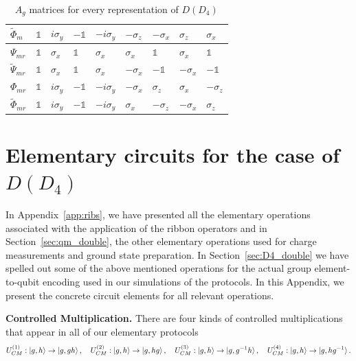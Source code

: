 \documentclass[two column]{article}
\begin{document}
\begin{table}[]
\begin{tabular}{|l||l|l|l|l|l|l|l|l|}
 $\tilde{\Phi}_{m}$ &$\mathbb{1}$&$i\sigma_y$ &$-\mathbb{1}$& $-i\sigma_y$ &$-\sigma_z$ &$-\sigma_x$ &  $\sigma_z$ &   $\sigma_x$ \\\hline
$\Psi_{mr}$ &$\mathbb{1}$&  $\sigma_x$ & $\mathbb{1}$&  $\sigma_x$ & $\sigma_x$ & $\mathbb{1}$&  $\sigma_x$ &   $\mathbb{1}$\\\hline
$\tilde{\Psi}_{mr}$ &$\mathbb{1}$&  $\sigma_x$ & $\mathbb{1}$&  $\sigma_x$ &$-\sigma_x$ &$-\mathbb{1}$& $-\sigma_x$ &  $-\mathbb{1}$\\\hline
$\Phi_{mr}$ &$\mathbb{1}$&$i\sigma_y$ &$-\mathbb{1}$& $-i\sigma_y$ &$-\sigma_x$ & $\sigma_z$ &  $\sigma_x$ &  $-\sigma_z$ \\\hline
$\tilde{\Phi}_{mr}$ &$\mathbb{1}$&$i\sigma_y$ &$-\mathbb{1}$& $-i\sigma_y$ & $\sigma_x$ &$-\sigma_z$ & $-\sigma_x$ &   $\sigma_z$ \\\hline
\end{tabular}
    \caption{$A_g$ matrices for every representation of $D(D_4)$}
    \label{tab:reps}
\end{table}




\section{Elementary circuits for the case of $D(D_4)$}\label{app:cirqs}

In Appendix~\ref{app:ribs}, we have presented all the elementary operations associated with the application of the ribbon operators and in Section~\ref{sec:qm_double}, the other elementary operations used for charge measurements and ground state preparation.
In Section~\ref{sec:D4_double} we have spelled out some of the above mentioned operations for the actual group element-to-qubit encoding used in our simulations of the protocols. In this Appendix, we present the concrete circuit elements for all relevant operations.

\textbf{Controlled Multiplication.} 
There are four kinds of controlled multiplications that appear in all of our elementary protocols
\begin{equation}\label{eq:circs}
U_{CM}^{(1)}: \ket{g,h} \rightarrow \ket{g, gh}, \quad
U_{CM}^{(2)}: \ket{g,h} \rightarrow \ket{g, hg}, \quad
U_{CM}^{(3)}: \ket{g,h} \rightarrow \ket{g, g^{-1}h}, \quad
U_{CM}^{(4)}: \ket{g,h} \rightarrow \ket{g, hg^{-1}}.	
\end{equation}
\end{document}
